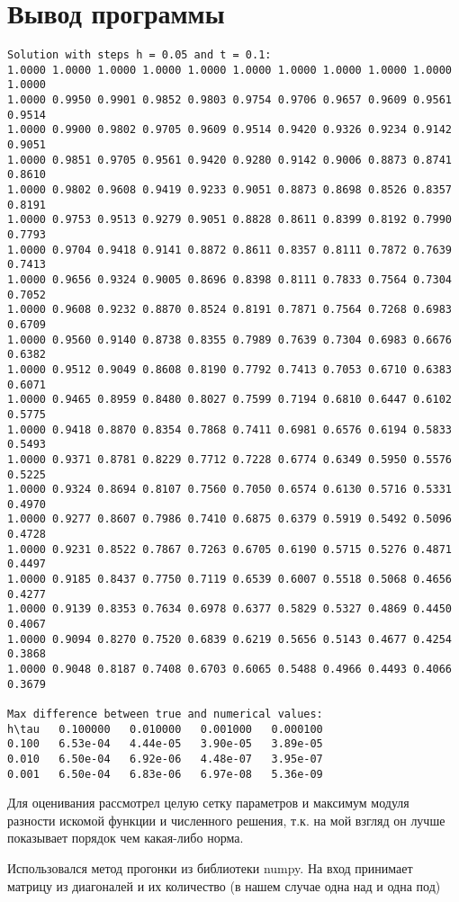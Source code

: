 \documentclass[a4paper]{article}
\newcommand{\anonsection}[1]{ \section*{#1} \addcontentsline{toc}{section}{\numberline {}#1}}
\begin{document}
	\anonsection{Вывод программы}
	\begin{footnotesize}
	\begin{lstlisting}
Solution with steps h = 0.05 and t = 0.1:
1.0000 1.0000 1.0000 1.0000 1.0000 1.0000 1.0000 1.0000 1.0000 1.0000 1.0000
1.0000 0.9950 0.9901 0.9852 0.9803 0.9754 0.9706 0.9657 0.9609 0.9561 0.9514
1.0000 0.9900 0.9802 0.9705 0.9609 0.9514 0.9420 0.9326 0.9234 0.9142 0.9051
1.0000 0.9851 0.9705 0.9561 0.9420 0.9280 0.9142 0.9006 0.8873 0.8741 0.8610
1.0000 0.9802 0.9608 0.9419 0.9233 0.9051 0.8873 0.8698 0.8526 0.8357 0.8191
1.0000 0.9753 0.9513 0.9279 0.9051 0.8828 0.8611 0.8399 0.8192 0.7990 0.7793
1.0000 0.9704 0.9418 0.9141 0.8872 0.8611 0.8357 0.8111 0.7872 0.7639 0.7413
1.0000 0.9656 0.9324 0.9005 0.8696 0.8398 0.8111 0.7833 0.7564 0.7304 0.7052
1.0000 0.9608 0.9232 0.8870 0.8524 0.8191 0.7871 0.7564 0.7268 0.6983 0.6709
1.0000 0.9560 0.9140 0.8738 0.8355 0.7989 0.7639 0.7304 0.6983 0.6676 0.6382
1.0000 0.9512 0.9049 0.8608 0.8190 0.7792 0.7413 0.7053 0.6710 0.6383 0.6071
1.0000 0.9465 0.8959 0.8480 0.8027 0.7599 0.7194 0.6810 0.6447 0.6102 0.5775
1.0000 0.9418 0.8870 0.8354 0.7868 0.7411 0.6981 0.6576 0.6194 0.5833 0.5493
1.0000 0.9371 0.8781 0.8229 0.7712 0.7228 0.6774 0.6349 0.5950 0.5576 0.5225
1.0000 0.9324 0.8694 0.8107 0.7560 0.7050 0.6574 0.6130 0.5716 0.5331 0.4970
1.0000 0.9277 0.8607 0.7986 0.7410 0.6875 0.6379 0.5919 0.5492 0.5096 0.4728
1.0000 0.9231 0.8522 0.7867 0.7263 0.6705 0.6190 0.5715 0.5276 0.4871 0.4497
1.0000 0.9185 0.8437 0.7750 0.7119 0.6539 0.6007 0.5518 0.5068 0.4656 0.4277
1.0000 0.9139 0.8353 0.7634 0.6978 0.6377 0.5829 0.5327 0.4869 0.4450 0.4067
1.0000 0.9094 0.8270 0.7520 0.6839 0.6219 0.5656 0.5143 0.4677 0.4254 0.3868
1.0000 0.9048 0.8187 0.7408 0.6703 0.6065 0.5488 0.4966 0.4493 0.4066 0.3679

Max difference between true and numerical values:
h\tau   0.100000   0.010000   0.001000   0.000100
0.100   6.53e-04   4.44e-05   3.90e-05   3.89e-05
0.010   6.50e-04   6.92e-06   4.48e-07   3.95e-07
0.001   6.50e-04   6.83e-06   6.97e-08   5.36e-09
	\end{lstlisting}
	\end{footnotesize}

	Для оценивания рассмотрел целую сетку параметров и максимум модуля разности искомой функции и численного решения, т.к. на мой взгляд он лучше показывает порядок чем какая-либо норма.
		
	Использовался метод прогонки из библиотеки numpy. На вход принимает матрицу из диагоналей и их количество (в нашем случае одна над и одна под)
	\newpage
		
\end{document}
